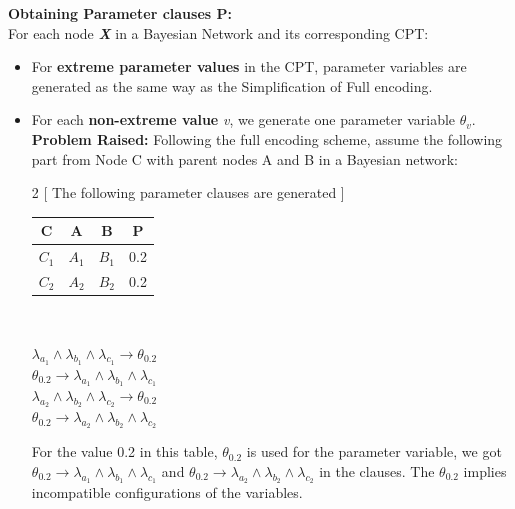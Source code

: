         \noindent \textbf{Obtaining Parameter clauses \textsc{P}:}\\
        For each node \textbf{\textit{X}} in a Bayesian Network and its corresponding CPT:
        \begin{itemize}
            \item For \textbf{extreme parameter values} in the CPT, parameter variables are generated as the same way as the Simplification of  Full encoding.
            \item For each \textbf{non-extreme value} \textit{v}, we generate one parameter variable $\theta_{v}$.\\
        \textbf{Problem Raised:} Following the full encoding scheme, assume the following part from Node C with parent nodes A and B in a Bayesian network:
        \begin{multicols}{2}
        [
        The following parameter clauses are generated
        ]
        
        \begin{center}
        \vspace{10mm}
            \begin{tabular}{ c c c c } 
            \hline
            C & A & B & P\\
            \hline
            \hline
            $C_1$ & $A_1$ & $B_1$ & 0.2\\
            $C_2$ & $A_2$ & $B_2$ & 0.2\\
            \hline
            \end{tabular}\\ 
        \end{center} 
        \columnbreak
            
        $\lambda_{a_{1}} \wedge \lambda_{b_{1}} \wedge \lambda_{c_{1}} \rightarrow \theta_{0.2}$\\
        $ \theta_{0.2} \rightarrow \lambda_{a_{1}} \wedge \lambda_{b_{1}} \wedge \lambda_{c_{1}}$\\
        $\lambda_{a_{2}} \wedge \lambda_{b_{2}} \wedge \lambda_{c_{2}} \rightarrow \theta_{0.2}$\\
        $ \theta_{0.2} \rightarrow \lambda_{a_{2}} \wedge \lambda_{b_{2}} \wedge \lambda_{c_{2}}$\\
        \end{multicols}
        
        For the value 0.2 in this table, $\theta_{0.2}$ is used for the parameter variable, we got $ \theta_{0.2} \rightarrow \lambda_{a_{1}} \wedge \lambda_{b_{1}} \wedge \lambda_{c_{1}}$ and $ \theta_{0.2} \rightarrow \lambda_{a_{2}} \wedge \lambda_{b_{2}} \wedge \lambda_{c_{2}}$ in the clauses. The $\theta_{0.2}$ implies incompatible configurations of the variables\cite{enc2}.  \\
        

\end{itemize}
